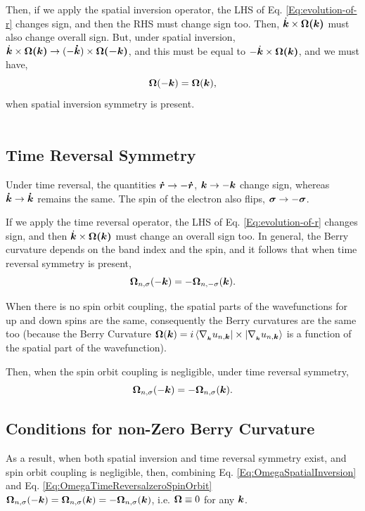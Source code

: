 \documentclass{report}
\renewcommand\vec[1]{\ensuremath\boldsymbol{#1}} %
\begin{document}
Then, if we apply the spatial inversion operator, the LHS of Eq. \eqref{Eq:evolution-of-r} changes sign, and then the RHS must change sign too. Then, $\dot{\vec{k}}\times \vec{\Omega(\vec{k})}$ must also change overall sign. But, under spatial inversion,  $\dot{\vec{k}}\times \vec{\Omega(\vec{k})} \rightarrow (-\vec{\dot{k}})\times \vec{\Omega(\vec{-k})}$, and this must be equal to $-\dot{\vec{k}}\times \vec{\Omega(\vec{k})}$, and we must have, 
\begin{equation}\label{Eq:OmegaSpatialInversion}
	\vec{\Omega}(-\vec{k}) = \vec{\Omega}(\vec{k}),
\end{equation}
when spatial inversion symmetry is present.\\\\

\subsection{Time Reversal Symmetry}
Under time reversal, the quantities $\vec{\dot{r}} \rightarrow -\vec{\dot{r}}$, $\vec{k} \rightarrow -\vec{k}$ change sign, whereas $\vec{\dot{k}} \rightarrow \vec{\dot{k}}$ remains the same. The spin of the electron also flips, $\vec{\sigma} \rightarrow -\vec{\sigma}$.

If we apply the time reversal operator, the LHS of Eq. \eqref{Eq:evolution-of-r} changes sign, and then $\dot{\vec{k}}\times \vec{\Omega(\vec{k})}$ must change an overall sign too. In general, the Berry curvature depends on the band index and the spin, and it follows that when time reversal symmetry is present,
\begin{equation}\label{Eq:OmegaTimeReversal}
	\vec{\Omega}_{n,\sigma}(-\vec{k}) = -\vec{\Omega}_{n,-\sigma}(\vec{k}).
\end{equation}

When there is no spin orbit coupling, the spatial parts of the wavefunctions for up and down spins are the same, consequently the Berry curvatures are the same too (because the Berry Curvature $\vec{\Omega}(\vec{k}) = i \bra{\nabla_{_{\vec{k}}} u_{n,\vec{k}}}\times \ket{\nabla_{_{\vec{k}}} u_{n,\vec{k}}}$ is a function of the spatial part of the wavefunction).

Then, when the spin orbit coupling is negligible, under time reversal symmetry,
\begin{equation}\label{Eq:OmegaTimeReversalzeroSpinOrbit}
	\vec{\Omega}_{n,\sigma}(-\vec{k}) = -\vec{\Omega}_{n,\sigma}(\vec{k}).
\end{equation}
\subsection{Conditions for non-Zero Berry Curvature}
As a result, when both spatial inversion and time reversal symmetry exist, and spin orbit coupling is negligible, then, combining Eq. \eqref{Eq:OmegaSpatialInversion} and Eq. \eqref{Eq:OmegaTimeReversalzeroSpinOrbit} $\vec{\Omega}_{n,\sigma}(-\vec{k}) = \vec{\Omega}_{n,\sigma}(\vec{k}) = -\vec{\Omega}_{n,\sigma}(\vec{k})$, i.e. $\vec{\Omega} \equiv 0$ for any $\vec{k}$.
\end{document}
